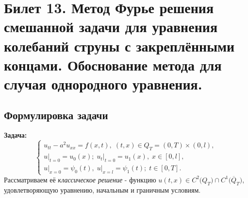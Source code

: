 \documentclass[../main.tex]{subfiles}
\begin{document}
\section{Билет 13. Метод Фурье решения смешанной задачи для уравнения колебаний струны с закреплёнными концами. Обоснование метода для случая однородного уравнения.}
\subsection{Формулировка задачи}
\textbf{Задача:}
\begin{equation}
\label{eq:13_1}
\begin{cases}
	u_{tt} - a^2u_{xx} = f(x, t),\; (t, x) \in Q_{T} = (0, T) \times (0, l), \\
    u\bigr|_{t = 0} = u_{0}(x);\; u_{t}\bigr|_{t =0} = u_{1}(x),\; x \in [0, l], \\
    u\bigr|_{x = 0} = \psi_{0}(t),\; u\bigr|_{x = l} = \psi_{1}(t);\; t \in [0, T].
\end{cases}
\end{equation}
Рассматриваем её \textit{классическое решение} - функцию $u(t, x) \in C^{2}\bigl(Q_{T}\bigr) \cap C^{1}\bigl(\overline{Q}_{T}\bigr)$, удовлетворяющую уравнению, начальным и граничным условиям. \\
\end{document}
